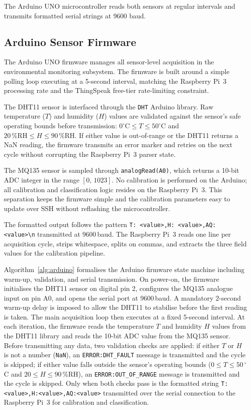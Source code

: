 The Arduino UNO microcontroller reads both sensors at regular
intervals and transmits formatted serial strings at 9600 baud.

\subsection{Arduino Sensor Firmware}

The Arduino UNO firmware manages all sensor-level acquisition in the
environmental monitoring subsystem. The firmware is built around a simple
polling loop executing at a 5-second interval, matching the Raspberry Pi~3
processing rate and the ThingSpeak free-tier rate-limiting constraint.

The DHT11 sensor is interfaced through the \texttt{DHT} Arduino library.
Raw temperature ($T$) and humidity ($H$) values are validated against the
sensor's safe operating bounds before transmission:
$0^\circ\text{C}\le T\le 50^\circ\text{C}$ and
$20\,\%\text{RH}\le H\le 90\,\%\text{RH}$. If either value is
out-of-range or the DHT11 returns a NaN reading, the firmware transmits
an error marker and retries on the next cycle without corrupting the
Raspberry Pi~3 parser state.

The MQ135 sensor is sampled through \texttt{analogRead(A0)}, which
returns a 10-bit ADC integer in the range $[0,\,1023]$. No calibration
is performed on the Arduino; all calibration and classification logic
resides on the Raspberry Pi~3. This separation keeps the firmware simple
and the calibration parameters easy to update over SSH without
reflashing the microcontroller.

The formatted output follows the pattern
\texttt{T:\,<value>,H:\,<value>,AQ:\,<value>\textbackslash n}
transmitted at 9600\,baud. The Raspberry Pi~3 reads one line per
acquisition cycle, strips whitespace, splits on commas, and extracts the
three field values for the calibration pipeline.

Algorithm~\ref{alg:arduino} formalises the Arduino firmware state machine including warm-up, validation, and serial transmission. On power-on, the firmware initialises the DHT11 sensor on digital pin 2, configures the MQ135 analogue input on pin A0, and opens the serial port at 9600\,baud. A mandatory 2-second warm-up delay is imposed to allow the DHT11 to stabilise before the first reading is taken. The main acquisition loop then executes at a fixed 5-second interval. At each iteration, the firmware reads the temperature $T$ and humidity $H$ values from the DHT11 library and reads the 10-bit ADC value from the MQ135 sensor. Before transmitting any data, two validation checks are applied: if either $T$ or $H$ is not a number (\texttt{NaN}), an \texttt{ERROR:DHT\_FAULT} message is transmitted and the cycle is skipped; if either value falls outside the sensor's operating bounds ($0\le T\le 50\,^\circ$C and $20\le H\le 90$\,\%RH), an \texttt{ERROR:OUT\_OF\_RANGE} message is transmitted and the cycle is skipped. Only when both checks pass is the formatted string \texttt{T:\!<value>,H:\!<value>,AQ:\!<value>} transmitted over the serial connection to the Raspberry Pi~3 for calibration and classification.

